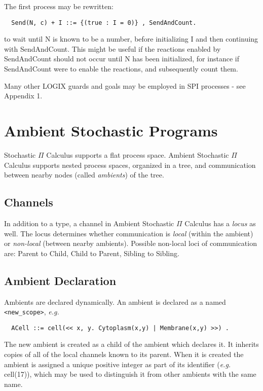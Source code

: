 \noindent
The first process may be rewritten:

\begin{verbatim}
  Send(N, c) + I ::= {(true : I = 0)} , SendAndCount.
\end{verbatim}

\noindent
to wait until N is known to be a number, before initializing
I and then continuing with SendAndCount.  This might be useful
if the reactions enabled by SendAndCount should not occur
until N has been initialized, for instance if SendAndCount
were to enable the reactions, and subsequently count them.
\newline

\noindent
Many other LOGIX guards and goals may be employed in SPI processes -
see \cite{logix:user-man} Appendix 1.

\chapter{Ambient Stochastic Programs}
\label{aspic}

Stochastic $\Pi$ Calculus supports a flat process space.  Ambient
Stochastic $\Pi$ Calculus supports nested process spaces,
organized in a tree, and
communication between nearby nodes (called {\em ambients}) of the tree.

\section{Channels}

In addition to a type, a channel in Ambient Stochastic $\Pi$ Calculus
has a {\em locus} as well.  The
locus determines whether communication is {\em local} (within the ambient)
or {\em non-local} (between nearby ambients).  Possible non-local loci of
communication are: Parent to Child, Child to Parent, Sibling to
Sibling.

\section{Ambient Declaration}

Ambients are declared dynamically.
An ambient is declared as a named \verb+<new_scope>+, {\em e.g.}

\begin{verbatim}
  ACell ::= cell(<< x, y. Cytoplasm(x,y) | Membrane(x,y) >>) .
\end{verbatim}

The new ambient is created as a child of the ambient which declares it.
It inherits copies of all of the local channels known to its parent.
When it is created the ambient is assigned a unique positive integer
as part of its identifier ({\em e.g.} cell(17)), which may be used
to distinguish it from other ambients with the same name.

